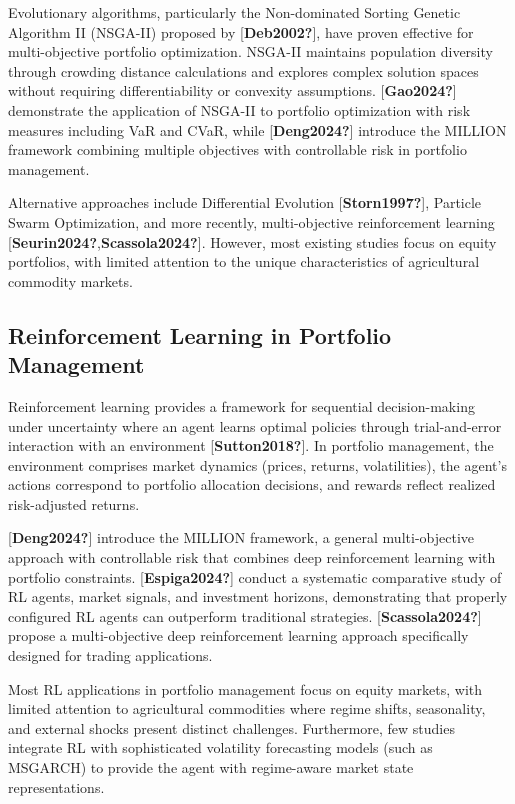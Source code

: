 \documentclass[
  10pt,
  a4paper,
]{article}
\begin{document}
Evolutionary algorithms, particularly the Non-dominated Sorting Genetic
Algorithm II (NSGA-II) proposed by {[}\textbf{Deb2002?}{]}, have proven
effective for multi-objective portfolio optimization. NSGA-II maintains
population diversity through crowding distance calculations and explores
complex solution spaces without requiring differentiability or convexity
assumptions. {[}\textbf{Gao2024?}{]} demonstrate the application of
NSGA-II to portfolio optimization with risk measures including VaR and
CVaR, while {[}\textbf{Deng2024?}{]} introduce the MILLION framework
combining multiple objectives with controllable risk in portfolio
management.

Alternative approaches include Differential Evolution
{[}\textbf{Storn1997?}{]}, Particle Swarm Optimization, and more
recently, multi-objective reinforcement learning
{[}\textbf{Seurin2024?},\textbf{Scassola2024?}{]}. However, most
existing studies focus on equity portfolios, with limited attention to
the unique characteristics of agricultural commodity markets.

\subsection{Reinforcement Learning in Portfolio
Management}\label{sec-lit-rl}

Reinforcement learning provides a framework for sequential
decision-making under uncertainty where an agent learns optimal policies
through trial-and-error interaction with an environment
{[}\textbf{Sutton2018?}{]}. In portfolio management, the environment
comprises market dynamics (prices, returns, volatilities), the agent's
actions correspond to portfolio allocation decisions, and rewards
reflect realized risk-adjusted returns.

{[}\textbf{Deng2024?}{]} introduce the MILLION framework, a general
multi-objective approach with controllable risk that combines deep
reinforcement learning with portfolio constraints.
{[}\textbf{Espiga2024?}{]} conduct a systematic comparative study of RL
agents, market signals, and investment horizons, demonstrating that
properly configured RL agents can outperform traditional strategies.
{[}\textbf{Scassola2024?}{]} propose a multi-objective deep
reinforcement learning approach specifically designed for trading
applications.

Most RL applications in portfolio management focus on equity markets,
with limited attention to agricultural commodities where regime shifts,
seasonality, and external shocks present distinct challenges.
Furthermore, few studies integrate RL with sophisticated volatility
forecasting models (such as MSGARCH) to provide the agent with
regime-aware market state representations.
\end{document}
